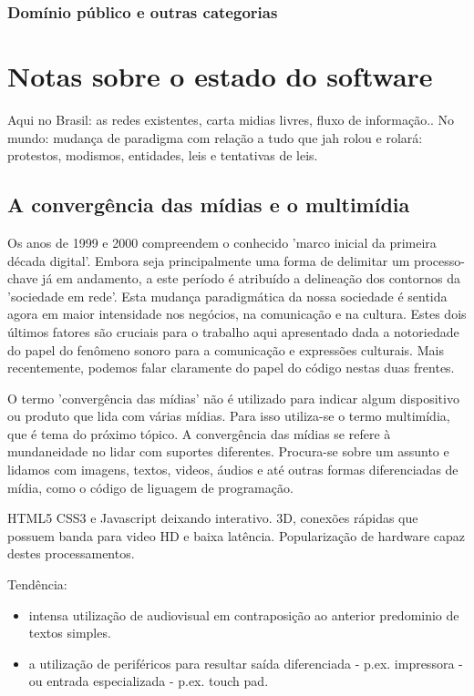 	  \subsubsection{Domínio público e outras categorias}


  \section{Notas sobre o estado do software}
  \label{sec:context}
  Aqui no Brasil: as redes existentes, carta midias livres, fluxo de informação..
  No mundo: mudança de paradigma com relação a tudo que jah rolou e rolará:
  protestos, modismos, entidades, leis e tentativas de leis.

      \subsection{A convergência das mídias e o multimídia}
      \label{sec:midiamultimidia}

      Os anos de 1999 e 2000 compreendem o conhecido 'marco inicial da primeira década digital'.
      Embora seja principalmente uma forma de delimitar um processo-chave já em andamento, a este período é atribuído
      a delineação dos contornos da 'sociedade em rede'. Esta mudança paradigmática da nossa
      sociedade é sentida agora em maior intensidade nos negócios, na comunicação e na cultura. Estes dois
      últimos fatores são cruciais para o trabalho aqui apresentado dada a notoriedade do papel do
      fenômeno sonoro para a comunicação e expressões culturais. Mais recentemente, podemos falar claramente
      do papel do código nestas duas frentes.

      O termo 'convergência das mídias' não é utilizado para indicar algum dispositivo ou produto que
      lida com várias mídias. Para isso utiliza-se o termo multimídia, que é tema do próximo tópico.
      A convergência das mídias se refere à mundaneidade no lidar com suportes diferentes. Procura-se
      sobre um assunto e lidamos com imagens, textos, videos, áudios e até outras formas diferenciadas
      de mídia, como o código de liguagem de programação.


      HTML5 CSS3 e Javascript deixando interativo. 3D, conexões rápidas que possuem banda para video HD e
      baixa latência. Popularização de hardware capaz destes processamentos.

      Tendência:
      \begin{itemize}
	  \item intensa utilização de audiovisual em contraposição ao
      anterior predominio de textos simples.
	  \item a utilização de periféricos para resultar saída diferenciada - p.ex.
      impressora - ou entrada especializada - p.ex. touch pad.
      \end{itemize}


